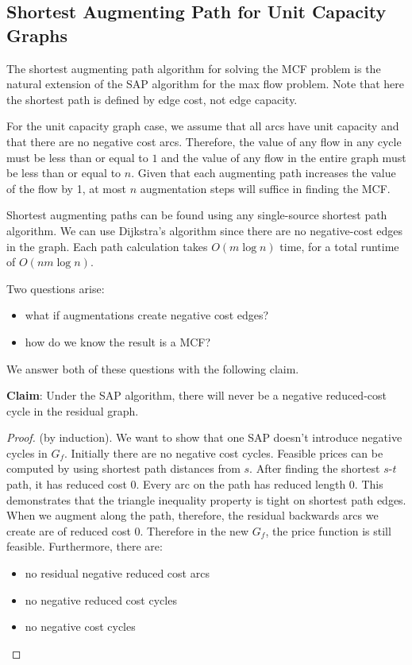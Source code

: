 \documentclass{article}
\begin{document}
\subsection{Shortest Augmenting Path for Unit Capacity Graphs}

The shortest augmenting path algorithm for solving the MCF problem is the natural extension of the SAP algorithm for the max flow problem. Note that here the shortest path is defined by edge cost, not edge capacity.

For the unit capacity graph case, we assume that all arcs have unit capacity and that there are no negative cost arcs.  Therefore, the value of any flow in any cycle must be less than or equal to $1$ and the value of any flow in the entire graph must be less than or equal to $n$. Given that each augmenting path increases the value of the flow by 1, at most $n$ augmentation steps will suffice in finding the MCF.

Shortest augmenting paths can be found using any single-source shortest path algorithm.  We can use Dijkstra's algorithm since there are no negative-cost edges in the graph.  Each path calculation takes $O(m \log n)$ time, for a total runtime of $O(nm \log n)$.

Two questions arise:
\begin{itemize}
\item what if augmentations create negative cost edges?
\item how do we know the result is a MCF?
\end{itemize}

We answer both of these questions with the following claim.

\textbf{Claim}:
Under the SAP algorithm, there will never be a negative
reduced-cost cycle in the residual graph.

\begin{proof}
(by induction).  We want to show that one SAP doesn't introduce
negative cycles in $G_f$.  Initially there are no negative cost
cycles.  Feasible prices can be computed by using shortest path
distances from $s$.  After finding the shortest $s$-$t$ path, it has
reduced cost 0.  Every arc on the path has reduced length 0.  This
demonstrates that the triangle inequality property is tight on
shortest path edges.  When we augment along the path, therefore, the
residual backwards arcs we create are of reduced cost 0.  Therefore in
the new $G_f$, the price function is still feasible.  Furthermore,
there are:
\begin{itemize}
\item no residual negative reduced cost arcs
\item no negative reduced cost cycles
\item no negative cost cycles
\end{itemize}
\end{proof}
\end{document}
